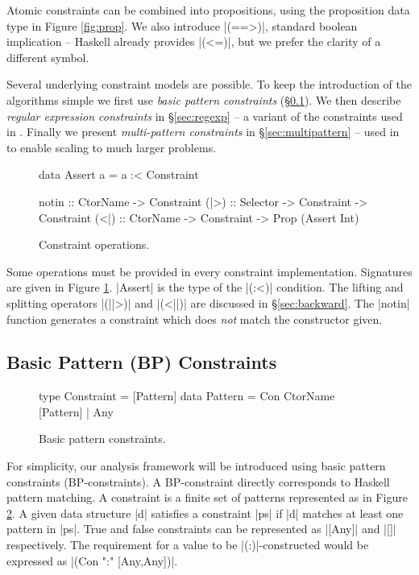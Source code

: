 Atomic constraints can be combined into propositions, using the proposition data type in Figure \ref{fig:prop}. We also introduce |(==>)|, standard boolean implication -- Haskell already provides |(<=)|, but we prefer the clarity of a different symbol.

Several underlying constraint models are possible. To keep the introduction of the algorithms simple we first use \textit{basic pattern constraints} (\S\ref{sec:basic}). We then describe \textit{regular expression constraints} in \S\ref{sec:regexp} -- a variant of the constraints used in \oldtool{}. Finally we present \textit{multi-pattern constraints} in \S\ref{sec:multipattern} -- used in \newtool{} to enable scaling to much larger problems.

\begin{figure}
\begin{code}
data Assert a = a :< Constraint

notin :: CtorName -> Constraint
(|>) :: Selector -> Constraint -> Constraint
(<|) :: CtorName -> Constraint -> Prop (Assert Int)
\end{code}
\caption{Constraint operations.}
\label{fig:constraint}
\end{figure}

Some operations must be provided in every constraint implementation. Signatures are given in Figure \ref{fig:constraint}. |Assert| is the type of the |(:<)| condition. The lifting and splitting operators |(||>)| and |(<||)| are discussed in \S\ref{sec:backward}. The |notin| function generates a constraint which does \textit{not} match the constructor given.


\subsection{Basic Pattern (BP) Constraints}
\label{sec:basic}

\begin{figure}
\begin{code}
type Constraint  =  [Pattern]
data Pattern     =  Con CtorName [Pattern] | Any
\end{code}
\caption{Basic pattern constraints.}
\label{fig:basic}
\end{figure}

For simplicity, our analysis framework will be introduced using basic pattern constraints (BP-constraints). A BP-constraint directly corresponds to Haskell pattern matching. A constraint is a finite set of patterns represented as in Figure \ref{fig:basic}. A given data structure |d| satisfies a constraint |ps| if |d| matches at least one pattern in |ps|. True and false constraints can be represented as |[Any]| and |[]| respectively. The requirement for a value to be |(:)|-constructed would be expressed as |(Con ":" [Any,Any])|.

